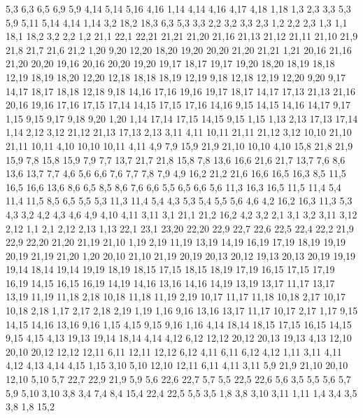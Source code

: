 %
5,3
6,3
6,5
6,9
5,9
%
4,14
5,14
5,16
4,16
%
1,14
4,14
4,16
4,17
4,18
1,18
%
1,3
2,3
3,3
5,3
5,9
5,11
5,14
4,14
1,14
%
3,2
18,2
18,3
6,3
5,3
3,3
%
2,2
3,2
3,3
2,3
%
1,2
2,2
2,3
1,3
%
1,1
18,1
18,2
3,2
2,2
1,2
21,1
22,1
22,21
21,21
21,20
21,16
21,13
21,12
21,11
21,10
21,9
21,8
21,7
21,6
21,2
%
1,20
9,20
12,20
18,20
19,20
20,20
21,20
21,21
1,21
%
20,16
21,16
21,20
20,20
%
19,16
20,16
20,20
19,20
19,17
%
18,17
19,17
19,20
18,20
18,19
18,18
%
12,19
18,19
18,20
12,20
%
12,18
18,18
18,19
12,19
%
9,18
12,18
12,19
12,20
9,20
%
9,17
14,17
18,17
18,18
12,18
9,18
%
14,16
17,16
19,16
19,17
18,17
14,17
%
17,13
21,13
21,16
20,16
19,16
17,16
17,15
17,14
%
14,15
17,15
17,16
14,16
%
9,15
14,15
14,16
14,17
9,17
%
1,15
9,15
9,17
9,18
9,20
1,20
%
1,14
17,14
17,15
14,15
9,15
1,15
%
1,13
2,13
17,13
17,14
1,14
%
2,12
3,12
21,12
21,13
17,13
2,13
%
3,11
4,11
10,11
21,11
21,12
3,12
%
10,10
21,10
21,11
10,11
%
4,10
10,10
10,11
4,11
%
4,9
7,9
15,9
21,9
21,10
10,10
4,10
%
15,8
21,8
21,9
15,9
%
7,8
15,8
15,9
7,9
%
7,7
13,7
21,7
21,8
15,8
7,8
%
13,6
16,6
21,6
21,7
13,7
%
7,6
8,6
13,6
13,7
7,7
%
4,6
5,6
6,6
7,6
7,7
7,8
7,9
4,9
%
16,2
21,2
21,6
16,6
16,5
16,3
%
8,5
11,5
16,5
16,6
13,6
8,6
%
6,5
8,5
8,6
7,6
6,6
%
5,5
6,5
6,6
5,6
%
11,3
16,3
16,5
11,5
11,4
%
5,4
11,4
11,5
8,5
6,5
5,5
%
5,3
11,3
11,4
5,4
%
4,3
5,3
5,4
5,5
5,6
4,6
%
4,2
16,2
16,3
11,3
5,3
4,3
%
3,2
4,2
4,3
4,6
4,9
4,10
4,11
3,11
%
3,1
21,1
21,2
16,2
4,2
3,2
%
2,1
3,1
3,2
3,11
3,12
2,12
%
1,1
2,1
2,12
2,13
1,13
22,1
23,1
23,20
22,20
22,9
22,7
22,6
22,5
22,4
22,2
%
21,9
22,9
22,20
21,20
21,19
21,10
%
1,19
2,19
11,19
13,19
14,19
16,19
17,19
18,19
19,19
20,19
21,19
21,20
1,20
%
20,10
21,10
21,19
20,19
20,13
20,12
%
19,13
20,13
20,19
19,19
19,14
%
18,14
19,14
19,19
18,19
18,15
%
17,15
18,15
18,19
17,19
%
16,15
17,15
17,19
16,19
%
14,15
16,15
16,19
14,19
14,16
%
13,16
14,16
14,19
13,19
13,17
%
11,17
13,17
13,19
11,19
11,18
%
2,18
10,18
11,18
11,19
2,19
%
10,17
11,17
11,18
10,18
%
2,17
10,17
10,18
2,18
%
1,17
2,17
2,18
2,19
1,19
%
1,16
9,16
13,16
13,17
11,17
10,17
2,17
1,17
%
9,15
14,15
14,16
13,16
9,16
%
1,15
4,15
9,15
9,16
1,16
%
4,14
18,14
18,15
17,15
16,15
14,15
9,15
4,15
%
4,13
19,13
19,14
18,14
4,14
%
4,12
6,12
12,12
20,12
20,13
19,13
4,13
%
12,10
20,10
20,12
12,12
12,11
%
6,11
12,11
12,12
6,12
%
4,11
6,11
6,12
4,12
%
1,11
3,11
4,11
4,12
4,13
4,14
4,15
1,15
%
3,10
5,10
12,10
12,11
6,11
4,11
3,11
%
5,9
21,9
21,10
20,10
12,10
5,10
%
5,7
22,7
22,9
21,9
5,9
%
5,6
22,6
22,7
5,7
%
5,5
22,5
22,6
5,6
%
3,5
5,5
5,6
5,7
5,9
5,10
3,10
3,8
%
3,4
7,4
8,4
15,4
22,4
22,5
5,5
3,5
%
1,8
3,8
3,10
3,11
1,11
%
1,4
3,4
3,5
3,8
1,8
%
15,2
